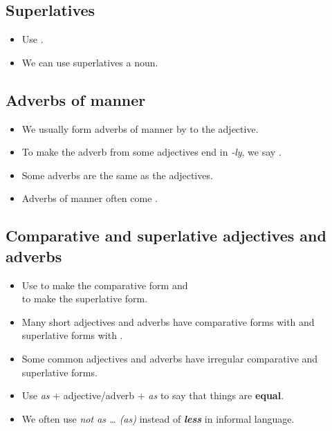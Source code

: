 \subsection{Superlatives}
\begin{itemize}
    \item Use .
    \item We can use superlatives  a noun.
\end{itemize}

\subsection{Adverbs of manner}
\begin{itemize}
    \item We usually form adverbs of manner by  to the adjective.
    \item To make the adverb from some adjectives end in \textit{-ly}, we say .
    \item Some adverbs are the same as the adjectives.
    \item Adverbs of manner often come .
\end{itemize}

\subsection{Comparative and superlative adjectives and adverbs}
\begin{itemize}
    \item Use  to make the comparative form and\\
     to make the superlative form.
    \item Many short adjectives and adverbs have comparative forms with 
    and superlative forms with .
    \item Some common adjectives and adverbs have irregular comparative and superlative forms.
    \item Use \textit{as} + adjective/adverb + \textit{as} to say that things are \textbf{equal}.
    \item[\ast] We often use \textit{not as \ldots{} (as)} instead of \textbf{\textit{less}} in informal language.
\end{itemize}

